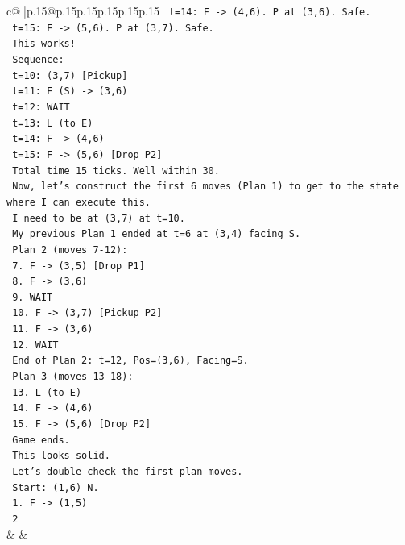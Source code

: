 \documentclass{article}
\begin{document}
{\begin{supertabular}{c@{$\;$}|p{.15\linewidth}@{}p{.15\linewidth}p{.15\linewidth}p{.15\linewidth}p{.15\linewidth}p{.15\linewidth}}
{{{\texttt{          t=14: F {-}> (4,6). P at (3,6). Safe.} \\
\texttt{          t=15: F {-}> (5,6). P at (3,7). Safe.} \\
\texttt{          This works!} \\
\texttt{          Sequence:} \\
\texttt{          t=10: (3,7) {[}Pickup{]}} \\
\texttt{          t=11: F (S) {-}> (3,6)} \\
\texttt{          t=12: WAIT} \\
\texttt{          t=13: L (to E)} \\
\texttt{          t=14: F {-}> (4,6)} \\
\texttt{          t=15: F {-}> (5,6) {[}Drop P2{]}} \\
\texttt{          Total time 15 ticks. Well within 30.} \\
\texttt{          Now, let's construct the first 6 moves (Plan 1) to get to the state where I can execute this.} \\
\texttt{          I need to be at (3,7) at t=10.} \\
\texttt{          My previous Plan 1 ended at t=6 at (3,4) facing S.} \\
\texttt{          Plan 2 (moves 7{-}12):} \\
\texttt{          7. F {-}> (3,5) {[}Drop P1{]}} \\
\texttt{          8. F {-}> (3,6)} \\
\texttt{          9. WAIT} \\
\texttt{          10. F {-}> (3,7) {[}Pickup P2{]}} \\
\texttt{          11. F {-}> (3,6)} \\
\texttt{          12. WAIT} \\
\texttt{          End of Plan 2: t=12, Pos=(3,6), Facing=S.} \\
\texttt{          Plan 3 (moves 13{-}18):} \\
\texttt{          13. L (to E)} \\
\texttt{          14. F {-}> (4,6)} \\
\texttt{          15. F {-}> (5,6) {[}Drop P2{]}} \\
\texttt{          Game ends.} \\
\texttt{          This looks solid.} \\
\texttt{          Let's double check the first plan moves.} \\
\texttt{          Start: (1,6) N.} \\
\texttt{          1. F {-}> (1,5)} \\
\texttt{          2} \\
            }
        }
    }
    & & \\ \\


\end{supertabular}}
\end{document}

